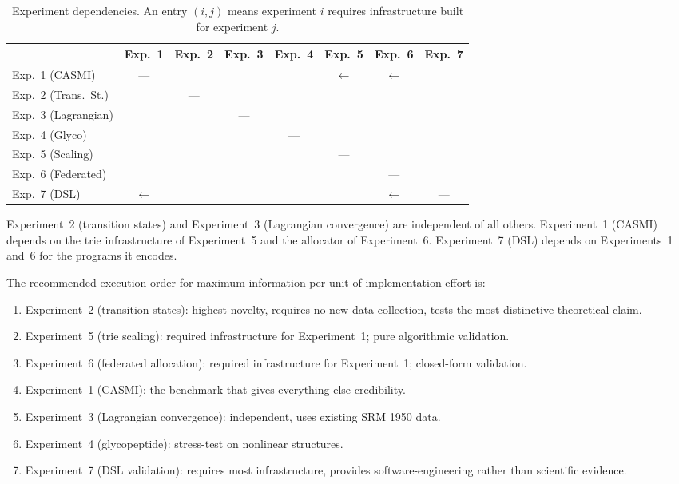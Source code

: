 \documentclass[11pt,a4paper]{article}
\theoremstyle{planstyle}
\theoremstyle{definition}
\theoremstyle{remark}
\begin{document}
\begin{table}[htbp]
\centering
\small
\caption{Experiment dependencies. An entry $(i, j)$ means experiment $i$
requires infrastructure built for experiment $j$.}
\label{tab:dependencies}
\begin{tabular}{@{}lccccccc@{}}
\toprule
 & Exp.~1 & Exp.~2 & Exp.~3 & Exp.~4 & Exp.~5 & Exp.~6 & Exp.~7 \\
\midrule
Exp.~1 (CASMI)       & ---  &      &      &      & $\leftarrow$ & $\leftarrow$ & \\
Exp.~2 (Trans.\ St.) &      & ---  &      &      &       &       & \\
Exp.~3 (Lagrangian)  &      &      & ---  &      &       &       & \\
Exp.~4 (Glyco)       &      &      &      & ---  &       &       & \\
Exp.~5 (Scaling)     &      &      &      &      & ---   &       & \\
Exp.~6 (Federated)   &      &      &      &      &       & ---   & \\
Exp.~7 (DSL)         & $\leftarrow$ & & & & & $\leftarrow$ & --- \\
\bottomrule
\end{tabular}
\end{table}

Experiment~2 (transition states) and Experiment~3 (Lagrangian
convergence) are independent of all others. Experiment~1 (CASMI)
depends on the trie infrastructure of Experiment~5 and the allocator
of Experiment~6. Experiment~7 (DSL) depends on Experiments~1 and~6
for the programs it encodes.

The recommended execution order for maximum information per unit of
implementation effort is:

\begin{enumerate}[nosep]
\item Experiment~2 (transition states): highest novelty, requires no
  new data collection, tests the most distinctive theoretical claim.
\item Experiment~5 (trie scaling): required infrastructure for
  Experiment~1; pure algorithmic validation.
\item Experiment~6 (federated allocation): required infrastructure for
  Experiment~1; closed-form validation.
\item Experiment~1 (CASMI): the benchmark that gives everything else
  credibility.
\item Experiment~3 (Lagrangian convergence): independent, uses existing
  SRM 1950 data.
\item Experiment~4 (glycopeptide): stress-test on nonlinear structures.
\item Experiment~7 (DSL validation): requires most infrastructure,
  provides software-engineering rather than scientific evidence.
\end{enumerate}
\end{document}
